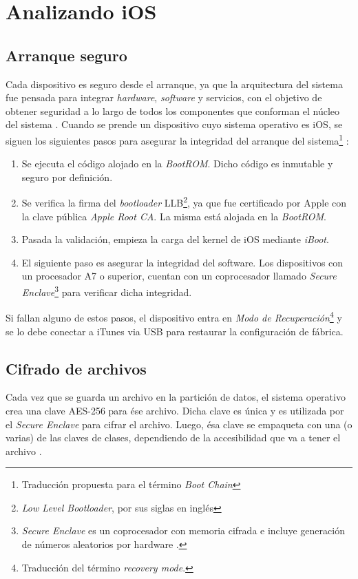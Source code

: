 \section{Analizando iOS}
\subsection{Arranque seguro}\label{fig:ch02:arranque}
Cada dispositivo es seguro desde el arranque, ya que la arquitectura del sistema fue pensada para integrar \textit{hardware}, \textit{software} y servicios, con el objetivo de obtener seguridad a lo largo de todos los componentes que conforman el núcleo del sistema \cite{asg}. Cuando se prende un dispositivo cuyo sistema operativo es iOS, se siguen los siguientes pasos para asegurar la integridad del arranque del sistema\footnote{Traducción propuesta para el término \textit{Boot Chain}} :
\begin{enumerate}
	\item Se ejecuta el código alojado en la \textit{BootROM}. Dicho código es inmutable y seguro por definición.
	\item Se verifica la firma del \textit{bootloader} LLB\footnote{\textit{Low Level Bootloader}, por sus siglas en inglés}, ya que fue certificado por Apple con la clave pública \textit{Apple Root CA}. La misma está alojada en la \textit{BootROM}. 
	\item Pasada la validación, empieza la carga del kernel de iOS mediante \textit{iBoot}.
	\item El siguiente paso es asegurar la integridad del software. Los dispositivos con un procesador A7 o superior, cuentan con un coprocesador llamado \textit{Secure Enclave}\footnote{\textit{Secure Enclave} es un coprocesador con memoria cifrada e incluye generación de números aleatorios por hardware \cite{asg}.} para verificar dicha integridad.
\end{enumerate}
Si fallan alguno de estos pasos, el dispositivo entra en \emph{Modo de Recuperación}\footnote{Traducción del término \textit{recovery mode}.} y se lo debe conectar a iTunes via USB para restaurar la configuración de fábrica.
\subsection{Cifrado de archivos}
Cada vez que se guarda un archivo en la partición de datos, el sistema operativo crea una clave AES-256 para ése archivo. Dicha clave es única y es utilizada por el \textit{Secure Enclave} para cifrar el archivo. Luego, ésa clave se empaqueta con una (o varias) de las claves de clases, dependiendo de la accesibilidad que va a tener el archivo \cite{asg}.\\

